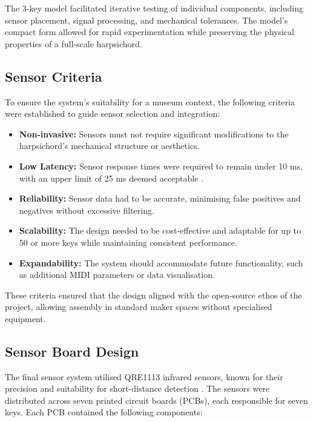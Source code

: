 The 3-key model facilitated iterative testing of individual components, including sensor placement, signal processing, and mechanical tolerances. The model’s compact form allowed for rapid experimentation while preserving the physical properties of a full-scale harpsichord.

\subsection{Sensor Criteria}\label{sensor-criteria}

To ensure the system's suitability for a museum context, the following criteria were established to guide sensor selection and integration:

\begin{itemize}
    \item \textbf{Non-invasive:} Sensors must not require significant modifications to the harpsichord's mechanical structure or aesthetics.
    \item \textbf{Low Latency:} Sensor response times were required to remain under 10 ms, with an upper limit of 25 ms deemed acceptable \cite{Jack2016}.
    \item \textbf{Reliability:} Sensor data had to be accurate, minimising false positives and negatives without excessive filtering.
    \item \textbf{Scalability:} The design needed to be cost-effective and adaptable for up to 50 or more keys while maintaining consistent performance.
    \item \textbf{Expandability:} The system should accommodate future functionality, such as additional MIDI parameters or data visualisation.
\end{itemize}

These criteria ensured that the design aligned with the open-source ethos of the project, allowing assembly in standard maker spaces without specialised equipment. 

\subsection{Sensor Board Design}\label{sensor-board}

The final sensor system utilised QRE1113 infrared sensors, known for their precision and suitability for short-distance detection \cite{McPherson2013, McPherson2019}. The sensors were distributed across seven printed circuit boards (PCBs), each responsible for seven keys. Each PCB contained the following components:


